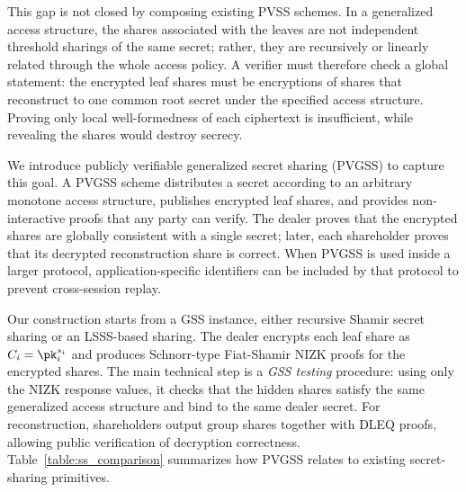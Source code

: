 \documentclass[runningheads]{llncs}
\begin{document}
This gap is not closed by composing existing PVSS schemes. In a generalized access structure, the shares associated with the leaves are not independent threshold sharings of the same secret; rather, they are recursively or linearly related through the whole access policy. A verifier must therefore check a global statement: the encrypted leaf shares must be encryptions of shares that reconstruct to one common root secret under the specified access structure. Proving only local well-formedness of each ciphertext is insufficient, while revealing the shares would destroy secrecy.

We introduce publicly verifiable generalized secret sharing (PVGSS) to capture this goal. A PVGSS scheme distributes a secret according to an arbitrary monotone access structure, publishes encrypted leaf shares, and provides non-interactive proofs that any party can verify. The dealer proves that the encrypted shares are globally consistent with a single secret; later, each shareholder proves that its decrypted reconstruction share is correct. When PVGSS is used inside a larger protocol, application-specific identifiers can be included by that protocol to prevent cross-session replay.

Our construction starts from a GSS instance, either recursive Shamir secret sharing or an LSSS-based sharing. The dealer encrypts each leaf share as \(C_i=\pk_i^{s_i}\) and produces Schnorr-type Fiat-Shamir NIZK proofs for the encrypted shares. The main technical step is a \emph{GSS testing} procedure: using only the NIZK response values, it checks that the hidden shares satisfy the same generalized access structure and bind to the same dealer secret. For reconstruction, shareholders output group shares together with DLEQ proofs, allowing public verification of decryption correctness. Table~\ref{table:ss_comparison} summarizes how PVGSS relates to existing secret-sharing primitives.
\end{document}
